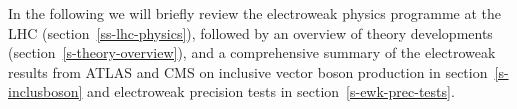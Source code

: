 





In the following we will briefly review the electroweak physics programme at the LHC (section~\ref{ss-lhc-physics}),
followed by an overview of theory developments (section~\ref{s-theory-overview}), and a comprehensive
summary of the electroweak results from ATLAS and CMS on inclusive vector boson production in section~\ref{s-inclusboson} 
and electroweak precision tests in section~\ref{s-ewk-prec-tests}. 

